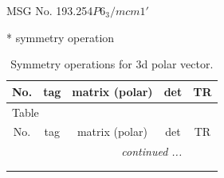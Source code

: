 \documentclass[fleqn,8pt]{jsarticle}
\begin{document}
\setcounter{MaxMatrixCols}{32}

\renewcommand{\tablename}{Table~}
\renewcommand{\figurename}{Figure~}
\begin{center}
\LARGE
MSG No. 193.254\quad$P6_{3}/mcm1'$
\end{center}
* symmetry operation
\renewcommand{\arraystretch}{1.3}
\begin{longtable}{ccccc}
\caption{Symmetry operations for 3d polar vector.}
 \\
 \hline \hline
No. & tag & matrix (polar) & det & TR \\ \hline \endfirsthead

\multicolumn{4}{l}{\tablename\ \thetable{}} \\
 \hline \hline
No. & tag & matrix (polar) & det & TR \\ \hline \endhead

 \hline \hline
\multicolumn{4}{r}{\footnotesize\it continued ...} \\ \endfoot

 \hline \hline
\multicolumn{4}{r}{} \\ \endlastfoot


\end{longtable}
\end{document}
